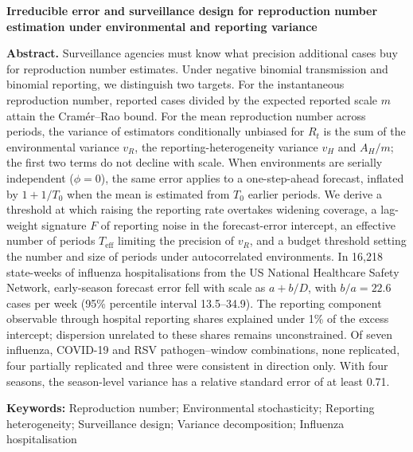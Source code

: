 \begin{center}
  {\large\bfseries Irreducible error and surveillance design for reproduction number estimation under environmental and reporting variance} %
\end{center}

\noindent\textbf{Abstract.} Surveillance agencies must know what precision additional cases buy for reproduction number estimates. Under negative binomial transmission and binomial reporting, we distinguish two targets. For the instantaneous reproduction number, reported cases divided by the expected reported scale $m$ attain the Cramér--Rao bound. For the mean reproduction number across periods, the variance of estimators conditionally unbiased for $R_t$ is the sum of the environmental variance $v_R$, the reporting-heterogeneity variance $v_H$ and $A_H/m$; the first two terms do not decline with scale. When environments are serially independent ($\phi=0$), the same error applies to a one-step-ahead forecast, inflated by $1+1/T_0$ when the mean is estimated from $T_0$ earlier periods. We derive a threshold at which raising the reporting rate overtakes widening coverage, a lag-weight signature $F$ of reporting noise in the forecast-error intercept, an effective number of periods $T_{\mathrm{eff}}$ limiting the precision of $v_R$, and a budget threshold setting the number and size of periods under autocorrelated environments. In 16,218 state-weeks of influenza hospitalisations from the US National Healthcare Safety Network, early-season forecast error fell with scale as $a+b/D$, with $b/a=22.6$ cases per week (95\% percentile interval 13.5--34.9). The reporting component observable through hospital reporting shares explained under 1\% of the excess intercept; dispersion unrelated to these shares remains unconstrained. Of seven influenza, COVID-19 and RSV pathogen--window combinations, none replicated, four partially replicated and three were consistent in direction only. With four seasons, the season-level variance has a relative standard error of at least 0.71. %

\vspace{0.4em}
\noindent\textbf{Keywords:} Reproduction number; Environmental stochasticity; Reporting heterogeneity; Surveillance design; Variance decomposition; Influenza hospitalisation
